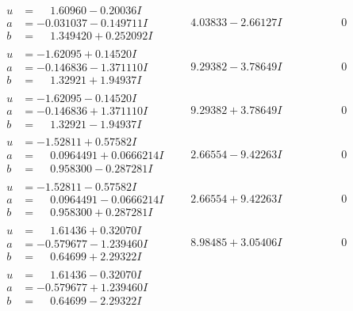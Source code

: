\documentclass[1p]{elsarticle_modified}
\theoremstyle{definition}
\begin{document}
$$\begin{array}{c|c|c}
\begin{aligned}
u &= \phantom{-}1.60960 - 0.20036 I \\
a &= -0.031037 - 0.149711 I \\
b &= \phantom{-}1.349420 + 0.252092 I\end{aligned}
 & \phantom{-}4.03833 - 2.66127 I & \phantom{-0.000000 } 0 \\ \hline\begin{aligned}
u &= -1.62095 + 0.14520 I \\
a &= -0.146836 - 1.371110 I \\
b &= \phantom{-}1.32921 + 1.94937 I\end{aligned}
 & \phantom{-}9.29382 - 3.78649 I & \phantom{-0.000000 } 0 \\ \hline\begin{aligned}
u &= -1.62095 - 0.14520 I \\
a &= -0.146836 + 1.371110 I \\
b &= \phantom{-}1.32921 - 1.94937 I\end{aligned}
 & \phantom{-}9.29382 + 3.78649 I & \phantom{-0.000000 } 0 \\ \hline\begin{aligned}
u &= -1.52811 + 0.57582 I \\
a &= \phantom{-}0.0964491 + 0.0666214 I \\
b &= \phantom{-}0.958300 - 0.287281 I\end{aligned}
 & \phantom{-}2.66554 - 9.42263 I & \phantom{-0.000000 } 0 \\ \hline\begin{aligned}
u &= -1.52811 - 0.57582 I \\
a &= \phantom{-}0.0964491 - 0.0666214 I \\
b &= \phantom{-}0.958300 + 0.287281 I\end{aligned}
 & \phantom{-}2.66554 + 9.42263 I & \phantom{-0.000000 } 0 \\ \hline\begin{aligned}
u &= \phantom{-}1.61436 + 0.32070 I \\
a &= -0.579677 - 1.239460 I \\
b &= \phantom{-}0.64699 + 2.29322 I\end{aligned}
 & \phantom{-}8.98485 + 3.05406 I & \phantom{-0.000000 } 0 \\ \hline\begin{aligned}
u &= \phantom{-}1.61436 - 0.32070 I \\
a &= -0.579677 + 1.239460 I \\
b &= \phantom{-}0.64699 - 2.29322 I\end{aligned}

\end{array}$$
\end{document}

